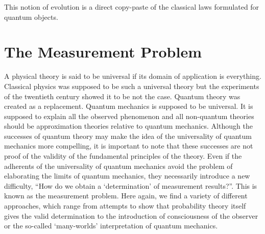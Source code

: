 \documentclass[11pt]{report}
\begin{document}
This notion of evolution is a direct copy-paste of the classical laws formulated for quantum objects. 

\section{The Measurement Problem}\label{section:Problem}
A physical theory is said to be universal if its domain of application is everything. Classical physics was supposed to be such a universal theory but the experiments of the twentieth century showed it to be not the case. Quantum theory was created as a replacement. Quantum mechanics is supposed to be universal. It is supposed to explain all the observed phenomenon and all non-quantum theories should be approximation theories relative to quantum mechanics. Although the successes of quantum theory may make the idea of the universality of quantum mechanics more compelling, it is important to note that these successes are not proof of the validity of the fundamental principles of the theory. Even if the adherents of the universality of quantum mechanics avoid the problem of elaborating the limits of quantum mechanics, they necessarily introduce a new difficulty, ``How do we obtain a `determination' of measurement results?''. This is known as the measurement problem. Here again, we find a variety of different approaches, which range from attempts to show that probability theory itself gives the valid determination to the introduction of consciousness of the observer or the so-called `many-worlds' interpretation of quantum mechanics. 
\end{document}
